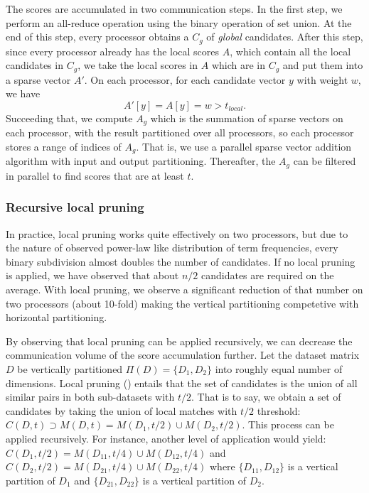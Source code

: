 \documentclass{comjnl}
\begin{document}
The scores are accumulated in two communication steps. In the first
step, we perform an all-reduce operation using the binary
operation of set union. At the end of this step, every processor
obtains a $C_g$ of \emph{global} candidates. After this step, since
every processor already has the local scores $A$, which contain all
the local candidates in $C_g$, we take the local scores in $A$ which
are in $C_g$ and put them into a sparse vector $A'$.  On each
processor, for each candidate vector $y$ with weight $w$, we have
\begin{displaymath}
A'[y]=A[y]=w>t_{local} .
\end{displaymath}
 Succeeding that, we compute $A_g$ which is
the summation of sparse vectors on each processor, with the result
partitioned over all processors, so each processor stores a range of
indices of $A_g$. That is, we use a parallel sparse vector addition
algorithm with input and output partitioning.  Thereafter, the $A_g$
can be filtered in parallel to find scores that are at least $t$.

\subsubsection{Recursive local pruning}

In practice, local pruning works quite effectively on two processors,
but due to the nature of observed power-law like distribution of term
frequencies, every binary subdivision almost doubles the number of
candidates. If no local pruning is applied, we have observed that
about $n/2$ candidates are required on the average. With local
pruning, we observe a significant reduction of that number on two
processors (about 10-fold) making the vertical partitioning
competetive with horizontal partitioning.

By observing that local pruning can be applied recursively, we can
decrease the communication volume of the score accumulation
further. Let the dataset matrix $D$ be vertically partitioned $\Pi(D)
= \{D_1,D_2\}$ into roughly equal number of dimensions. Local pruning
() entails that the set of candidates is
the union of all similar pairs in both sub-datasets with $t/2$. That
is to say, we obtain a set of candidates by taking the union of local
matches with $t/2$ threshold: $C(D, t) \supset M(D, t) = M(D_1,t/2)
\cup M(D_2, t/2)$. This process can be applied recursively. For
instance, another level of application would yield: $C(D_1, t/2) =
M(D_{11},t/4) \cup M(D_{12}, t/4)$ and $C(D_2, t/2) = M(D_{21},t/4)
\cup M(D_{22}, t/4)$ where $\{ D_{11}, D_{12} \}$ is a vertical
partition of $D_1$ and $\{ D_{21}, D_{22} \}$ is a vertical partition
of $D_2$.
\end{document}
